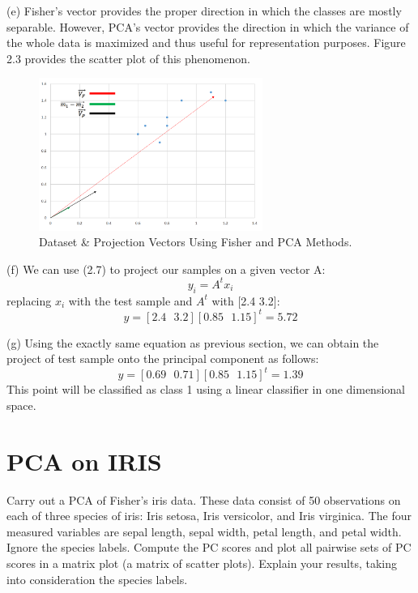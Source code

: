 \documentclass[12pt]{article}
\numberwithin{equation}{section}
\numberwithin{table}{section}
\numberwithin{figure}{section}
\begin{document}
(e) Fisher's vector provides the proper direction in which the classes are mostly separable. However, PCA's vector provides the direction in which the variance of the whole data is maximized and thus useful for representation purposes. Figure 2.3 provides the scatter plot of this phenomenon.
		\begin{figure}[!h]\centering
	\includegraphics[width=0.65\textwidth]{2_e.PNG}
	\caption{Dataset \& Projection Vectors Using Fisher and PCA Methods.}
	\label{pl1}
\end{figure}

(f) We can use (2.7) to project our samples on a given vector A:
\begin{equation}
	y_i = A^t x_i
\end{equation}
replacing $x_i$ with the test sample and $A^t$ with [2.4 3.2]:
$$
	y = [2.4 \ \ \ 3.2][0.85\ \ \ 1.15]^t = 5.72
$$

(g) Using the exactly same equation as previous section, we can obtain the project of test sample onto the principal component as follows:
$$
	y = [0.69 \ \ \ 0.71][0.85\ \ \ 1.15]^t = 1.39
$$	
This point will be classified as class 1 using a linear classifier in one dimensional space.

\section{PCA on IRIS}
Carry out a PCA of Fisher’s iris data. These data consist of 50 observations on each of three species of iris: Iris setosa, Iris versicolor, and Iris virginica. The four measured variables are sepal length, sepal width, petal length, and petal width. Ignore the species labels. Compute the PC scores and plot all pairwise sets of PC scores in a matrix plot (a matrix of scatter plots). Explain your results, taking into consideration the species labels. 
\end{document}
